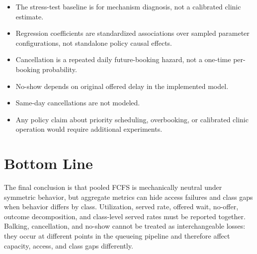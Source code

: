 \documentclass[11pt]{article}
\begin{document}
\begin{itemize}
  \item The stress-test baseline is for mechanism diagnosis, not a calibrated
        clinic estimate.
  \item Regression coefficients are standardized associations over sampled
        parameter configurations, not standalone policy causal effects.
  \item Cancellation is a repeated daily future-booking hazard, not a one-time
        per-booking probability.
  \item No-show depends on original offered delay in the implemented model.
  \item Same-day cancellations are not modeled.
  \item Any policy claim about priority scheduling, overbooking, or calibrated
        clinic operation would require additional experiments.
\end{itemize}

\section*{Bottom Line}

The final conclusion is that pooled FCFS is mechanically neutral under symmetric
behavior, but aggregate metrics can hide access failures and class gaps when
behavior differs by class. Utilization, served rate, offered wait, no-offer,
outcome decomposition, and class-level served rates must be reported together.
Balking, cancellation, and no-show cannot be treated as interchangeable losses:
they occur at different points in the queueing pipeline and therefore affect
capacity, access, and class gaps differently.
\end{document}

